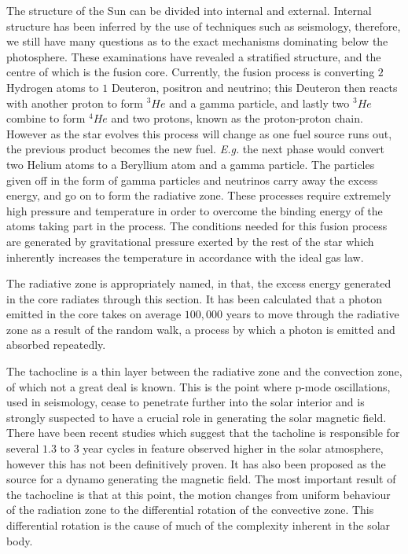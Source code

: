 The structure of the Sun can be divided into internal and external.
Internal structure has been inferred by the use of techniques such as seismology, therefore, we still have many questions as to the exact mechanisms dominating below the photosphere.
These examinations have revealed a stratified structure, and the centre of which is the fusion core.
Currently, the fusion process is converting $2$ Hydrogen atoms to $1$ Deuteron, positron and neutrino; this Deuteron then reacts with another proton to form ${^3}He$ and a gamma particle, and lastly two $^{3}He$ combine to form $^{4}He$ and two protons, known as the proton-proton chain. 
However as the star evolves this process will change as one fuel source runs out, the previous product becomes the new fuel.
\emph{E.g.} the next phase would convert two Helium atoms to a Beryllium atom and a gamma particle.
The particles given off in the form of gamma particles and neutrinos carry away the excess energy, and go on to form the radiative zone.
These processes require extremely high pressure and temperature in order to overcome the binding energy of the atoms taking part in the process.
The conditions needed for this fusion process are generated by gravitational pressure exerted by the rest of the star which inherently increases the temperature in accordance with the ideal gas law.

The radiative zone is appropriately named, in that, the excess energy generated in the core radiates through this section.
It has been calculated that a photon emitted in the core takes on average $100,000$ years to move through the radiative zone as a result of the random walk, a process by which a photon is emitted and absorbed repeatedly.

The tachocline is a thin layer between the radiative zone and the convection zone, of which not a great deal is known.
This is the point where p-mode oscillations, used in seismology, cease to penetrate further into the solar interior and is strongly suspected to have a crucial role in generating the solar magnetic field.
There have been recent studies which suggest that the tacholine is responsible for several $1.3$ to $3$ year cycles in feature observed higher in the solar atmosphere, however this has not been definitively proven.
It has also been proposed as the source for a dynamo generating the magnetic field.
The most important result of the tachocline is that at this point, the motion changes from uniform behaviour of the radiation zone to the differential rotation of the convective zone.
This differential rotation is the cause of much of the complexity inherent in the solar body.

